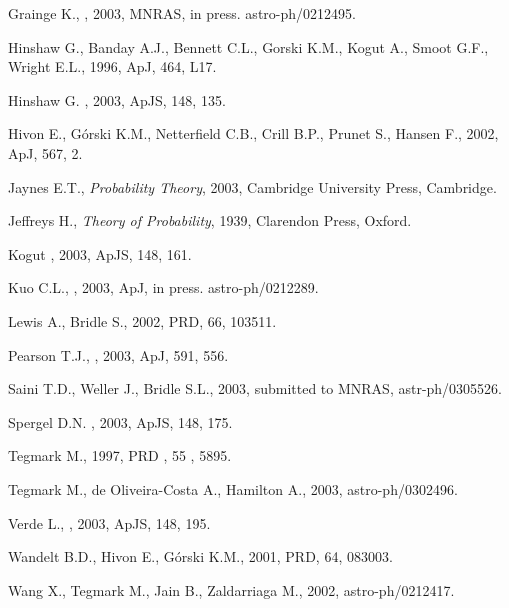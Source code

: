 \begin{thebibliography}{}
Grainge K., \etal, 2003, MNRAS, in press. astro-ph/0212495.

Hinshaw G., Banday A.J., Bennett C.L., Gorski K.M., Kogut A.,  Smoot G.F.,
Wright E.L., 1996, ApJ, 464, L17.

Hinshaw G. \etal, 2003, ApJS, 148, 135.

Hivon E., G\'orski K.M., Netterfield C.B., Crill B.P., Prunet S., Hansen F., 
2002, ApJ, 567, 2.

Jaynes E.T., {\it Probability Theory}, 2003, Cambridge University Press, Cambridge.

Jeffreys H., {\it Theory of Probability}, 1939, Clarendon Press, Oxford.

Kogut \etal, 2003, ApJS, 148, 161.

Kuo C.L., \etal, 2003, ApJ, in press. astro-ph/0212289.

Lewis A., Bridle S., 2002,  PRD, 66, 103511.


Pearson T.J.,  \etal, 2003, ApJ, 591, 556.


Saini T.D., Weller J., Bridle S.L.,  2003, submitted to MNRAS, astr-ph/0305526.

Spergel D.N. \etal, 2003, ApJS, 148, 175.

Tegmark M.,  1997, PRD   , 55 , 5895.

Tegmark M.,  de Oliveira-Costa A.,  Hamilton A., 2003,  astro-ph/0302496.

Verde L., \etal, 2003,  ApJS, 148, 195.

Wandelt B.D., Hivon E., G\'orski K.M.,  2001, PRD, 64, 083003.

Wang X., Tegmark M., Jain B., Zaldarriaga M., 2002, astro-ph/0212417.


\end{thebibliography}


\bye





